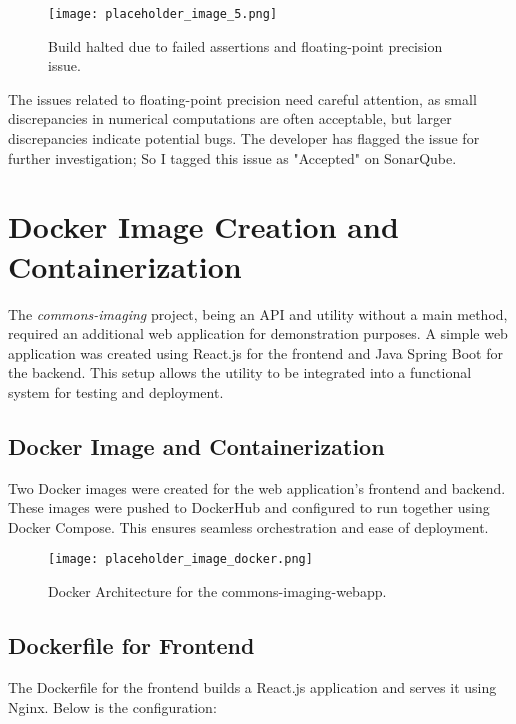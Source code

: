 \documentclass[a4paper,12pt]{report}
\begin{document}
\begin{figure}[H]
    \centering
    \texttt{[image: placeholder\_image\_5.png]} %
    \caption{Build halted due to failed assertions and floating-point precision issue.}
    \label{fig:error_log}
\end{figure}

The issues related to floating-point precision need careful attention, as small discrepancies in numerical computations are often acceptable, but larger discrepancies indicate potential bugs. The developer has flagged the issue for further investigation; So I tagged this issue as "Accepted" on SonarQube.

\chapter{Docker Image Creation and Containerization}
The \textit{commons-imaging} project, being an API and utility without a main method, required an additional web application for demonstration purposes. A simple web application was created using React.js for the frontend and Java Spring Boot for the backend. This setup allows the utility to be integrated into a functional system for testing and deployment.

\section{Docker Image and Containerization}
Two Docker images were created for the web application's frontend and backend. These images were pushed to DockerHub and configured to run together using Docker Compose. This ensures seamless orchestration and ease of deployment.

\begin{figure}[H]
    \centering
    \texttt{[image: placeholder\_image\_docker.png]} %
    \caption{Docker Architecture for the commons-imaging-webapp.}
    \label{fig:docker_architecture}
\end{figure}

\section{Dockerfile for Frontend}
The Dockerfile for the frontend builds a React.js application and serves it using Nginx. Below is the configuration:
\end{document}
